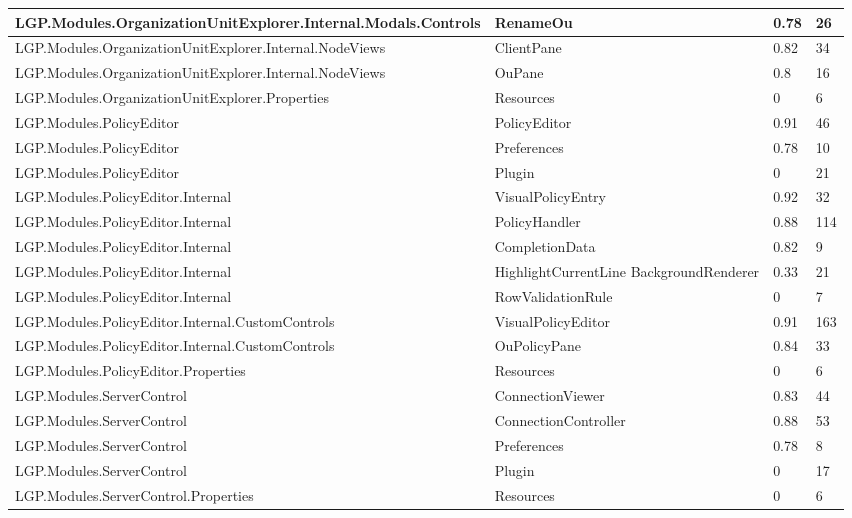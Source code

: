 \begin{table}[h!t]
{\begin{tabular}{ | p{85mm} | p{35mm} | p{13mm} | p{14mm}  | }
				LGP.Modules.OrganizationUnitExplorer.Internal.Modals.Controls & RenameOu & 0.78  & 26 \\ \hline
				LGP.Modules.OrganizationUnitExplorer.Internal.NodeViews & ClientPane & 0.82  & 34 \\ \hline
				LGP.Modules.OrganizationUnitExplorer.Internal.NodeViews & OuPane & 0.8   & 16 \\ \hline
				LGP.Modules.OrganizationUnitExplorer.Properties & Resources & 0     & 6 \\ \hline
				LGP.Modules.PolicyEditor & PolicyEditor & \cellcolor{ored}0.91  & \cellcolor{ored}46 \\ \hline
				LGP.Modules.PolicyEditor & Preferences & 0.78  & 10 \\ \hline				
				LGP.Modules.PolicyEditor & Plugin & 0     & 21 \\ \hline
				LGP.Modules.PolicyEditor.Internal & VisualPolicyEntry & \cellcolor{ored}0.92  & 32 \\ \hline
				LGP.Modules.PolicyEditor.Internal & PolicyHandler & \cellcolor{ored}0.88  & \cellcolor{ored}114 \\ \hline
				LGP.Modules.PolicyEditor.Internal & CompletionData & 0.82  & 9 \\ \hline	
				LGP.Modules.PolicyEditor.Internal & HighlightCurrentLine\newline
													BackgroundRenderer & 0.33  & 21 \\ \hline
				LGP.Modules.PolicyEditor.Internal & RowValidationRule & 0     & 7 \\ \hline
				LGP.Modules.PolicyEditor.Internal.CustomControls & VisualPolicyEditor & \cellcolor{ored}0.91  & \cellcolor{ored}163 \\ \hline
				LGP.Modules.PolicyEditor.Internal.CustomControls & OuPolicyPane & \cellcolor{ored}0.84  & 33 \\ \hline
				LGP.Modules.PolicyEditor.Properties & Resources & 0     & 6 \\ \hline
				LGP.Modules.ServerControl & ConnectionViewer & \cellcolor{ored}0.83  & \cellcolor{ored}44 \\ \hline
				LGP.Modules.ServerControl & ConnectionController & \cellcolor{ored}0.88  & \cellcolor{ored}53 \\ \hline
				LGP.Modules.ServerControl & Preferences & 0.78  & 8 \\ \hline
				LGP.Modules.ServerControl & Plugin & 0     & 17 \\ \hline
				LGP.Modules.ServerControl.Properties & Resources & 0     & 6 \\ \hline

\end{tabular}}
\end{table}
